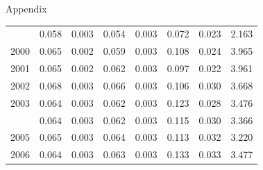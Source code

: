 \documentclass[10pt,ignorenonframetext,]{beamer}
\begin{document}
\begin{frame}[allowframebreaks]{Appendix}
\begin{longtable}[t]{rrrrrrrl}
\addlinespace
1999 & 0.058 & 0.003 & 0.054 & 0.003 & 0.072 & 0.023 & 2.163\\
2000 & 0.065 & 0.002 & 0.059 & 0.003 & 0.108 & 0.024 & 3.965\\
2001 & 0.065 & 0.002 & 0.062 & 0.003 & 0.097 & 0.022 & 3.961\\
2002 & 0.068 & 0.003 & 0.066 & 0.003 & 0.106 & 0.030 & 3.668\\
2003 & 0.064 & 0.003 & 0.062 & 0.003 & 0.123 & 0.028 & 3.476\\
\addlinespace
2004 & 0.064 & 0.003 & 0.062 & 0.003 & 0.115 & 0.030 & 3.366\\
2005 & 0.065 & 0.003 & 0.064 & 0.003 & 0.113 & 0.032 & 3.220\\
2006 & 0.064 & 0.003 & 0.063 & 0.003 & 0.133 & 0.033 & 3.477\\*
\end{longtable}\endgroup{}

\begingroup\fontsize{7}{9}\selectfont


\end{frame}
\end{document}
